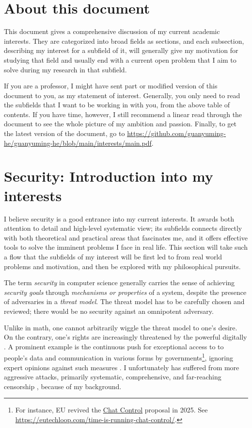 \documentclass[10pt]{article}
\begin{document}
\tableofcontents

\section*{About this document}
This document gives a comprehensive discussion of my current academic
interests. They are categorized into broad fields as sections, and each
subsection, describing my interest for a subfield of it, will generally give my
motivation for studying that field and usually end with a current open problem
that I aim to solve during my research in that subfield.

If you are a professor, I might have sent part or modified version of this
document to you, as my statement of interest. Generally, you only need to read
the subfields that I want to be working in with you, from the above table of
contents. If you have time, however, I still recommend a linear read through
the document to see the whole picture of my ambition and passion. Finally, to
get the latest version of the document, go to 
\url{https://github.com/guanyuming-he/guanyuming-he/blob/main/interests/main.pdf}.

\section[Security]{Security: Introduction into my interests}
I believe security is a good entrance into my current interests. It awards both
attention to detail and high-level systematic view; its subfields connects
directly with both theoretical and practical areas that fascinates me, and it
offers effective tools to solve the imminent problems I face in real life. This
section will take such a flow that the subfields of my interest will be first
led to from real world problems and motivation, and then be explored with my
philosophical pursuits.

The term \emph{security} in computer science generally carries the sense of
achieving \emph{security goals} through \emph{mechanisms or properties} of a
system, despite the presence of adversaries in a \emph{threat model}. The
threat model has to be carefully chosen and reviewed; there would be no
security against an omnipotent adversary.

Unlike in math, one cannot arbitrarily wiggle the threat model to one's desire.
On the contrary, one's rights are increasingly threatened by the
powerful digitally \cite{eu.digital.1, eu.digital.2, internet.shutdown.2024}. A
prominent example is the continuous push for exceptional access to to people's
data and communication in various forms by governments\footnote{ For instance,
	EU revived the \href{
https://eur-lex.europa.eu/legal-content/EN/TXT/?uri=COM\%3A2022\%3A209\%3AFIN}
{Chat Control} proposal in 2025. See \url{
https://eutechloop.com/time-is-running-chat-control/}.}, ignoring expert
opinions against such measures \cite{keys.under.doormats, bugs.in.our.pockets,
chatcontrolchildprotection}.
I unfortunately has suffered from more aggressive attacks, primarily
systematic, comprehensive, and far-reaching censorship \cite{internet.coup}
\cite[Sect.~5]{chall.censor.circum}, because of my background.
\end{document}
